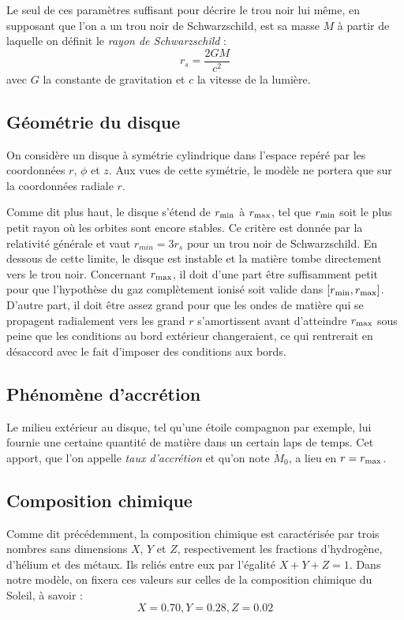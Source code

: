 \documentclass[a4paper,12pt]{article}
\begin{document}
Le seul de ces paramètres suffisant pour décrire le trou noir lui même, en supposant que l'on a un trou noir de Schwarzschild, est sa masse $M$ à partir de laquelle on définit le \textit{rayon de Schwarzschild} :
\begin{equation}
    r_s=\frac{2GM}{c^2}
\end{equation}
 avec $G$ la constante de gravitation et $c$ la vitesse de la lumière.

\subsection{Géométrie du disque}

On considère un disque à symétrie cylindrique dans l'espace repéré par les coordonnées $r$, $\phi$ et $z$. Aux vues de cette symétrie, le modèle ne portera que sur la coordonnées radiale $r$.

Comme dit plus haut, le disque s'étend de $r_{\rm{min}}$ à $r_{\rm{max}}$, tel que $r_{\rm{min}}$ soit le plus petit rayon où les orbites sont encore stables. Ce critère est donnée par la relativité générale et vaut $r_{min}=3r_s$ pour un trou noir de Schwarzschild. En dessous de cette limite, le disque est instable et la matière tombe directement vers le trou noir. Concernant $r_{\rm{max}}$, il doit d'une part être suffisamment petit pour que l'hypothèse du gaz complètement ionisé soit valide dans $[r_{\rm{min}}, r_{\rm{max}} ]$. D'autre part, il doit être assez grand pour que les ondes de matière qui se propagent radialement vers les grand $r$ s'amortissent avant d'atteindre $r_{\rm{max}}$ sous peine que les conditions au bord extérieur changeraient, ce qui rentrerait en désaccord avec le fait d'imposer des conditions aux bords.

\subsection{Phénomène d'accrétion}
Le milieu extérieur au disque, tel qu'une étoile compagnon par exemple, lui fournie une certaine quantité de matière dans un certain laps de temps. Cet apport, que l'on appelle \textit{taux d'accrétion} et qu'on note $\dot M_0$, a lieu en $r = r_{\rm{max}}$.

\subsection{Composition chimique}
Comme dit précédemment, la composition chimique est caractérisée par trois nombres sans dimensions $X$, $Y$ et $Z$, respectivement les fractions d'hydrogène, d'hélium et des métaux. Ils reliés entre eux par l'égalité $X+Y+Z=1$. Dans notre modèle, on fixera ces valeurs sur celles de la composition chimique du Soleil, à savoir :
\begin{equation}
    X=0.70,  Y=0.28, Z=0.02
\end{equation}
\end{document}
